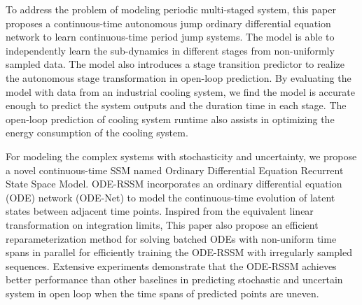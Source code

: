 To address the problem of modeling periodic multi-staged system, this paper proposes a continuous-time autonomous jump ordinary differential equation network to learn continuous-time period jump systems.
The model is able to independently learn the sub-dynamics in different stages from non-uniformly sampled data. 
The model also introduces a stage transition predictor to realize the autonomous stage transformation in open-loop prediction. 
By evaluating the model with data from an industrial cooling system, we find the model is accurate enough to predict the system outputs and the duration time in each stage.
The open-loop prediction of cooling system runtime also assists in optimizing the energy consumption of the cooling system.

For modeling the complex systems with stochasticity and uncertainty,  we propose a novel continuous-time SSM named Ordinary Differential Equation Recurrent State Space Model. 
ODE-RSSM incorporates an ordinary differential equation (ODE) network (ODE-Net) to model the continuous-time evolution of latent states between adjacent time points.
Inspired from the equivalent linear transformation on integration limits,
This paper also propose an efficient reparameterization method for solving batched ODEs with non-uniform time spans in parallel for efficiently training the ODE-RSSM with irregularly sampled sequences.
Extensive experiments demonstrate that the ODE-RSSM achieves better performance than other baselines in predicting stochastic and uncertain system in open loop when the time spans of predicted points are uneven.

